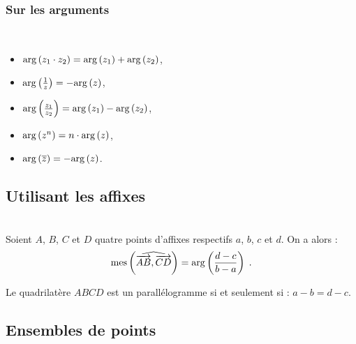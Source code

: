 \begin{fiche}
                  \subsubsection*{Sur les arguments} ~\\[-1.5\baselineskip]
                        \begin{itemize}
                              \item $\mathrm{arg}\left( z_1 \cdot z_2 \right) = \mathrm{arg}\left( z_1 \right) + \mathrm{arg}\left( z_2 \right)$,
                              \item $\mathrm{arg}\left( \frac{1}{z} \right) = -\mathrm{arg}\left( z \right)$,
                              \item $\mathrm{arg}\left( \frac{z_1}{z_2} \right) = \mathrm{arg}\left( z_1 \right) - \mathrm{arg}\left( z_2 \right)$,
                              \item $\mathrm{arg}\left( z^n \right) = n \cdot \mathrm{arg}\left( z \right)$,
                              \item $\mathrm{arg}\left( \overline{z} \right) = -\mathrm{arg}\left( z \right)$.
                        \end{itemize}
                  \subsection*{Utilisant les affixes} ~\\[-1.5\baselineskip]
                        Soient $A$, $B$, $C$ et $D$ quatre points d'affixes respectifs $a$, $b$, $c$ et $d$.
                        On a alors : 
                              \[
                              \mathrm{mes}\left( \widehat{ \overrightarrow{AB} , \overrightarrow{CD} } \right) = \mathrm{arg}\left( \frac{d - c}{b - a}  \right)\;.
                              \]
                        
                        Le quadrilat\`ere $ABCD$ est un parall\'elogramme si et seulement si : 
                              $a-b = d-c$.
      \subsection*{Ensembles de points}

\end{fiche}
